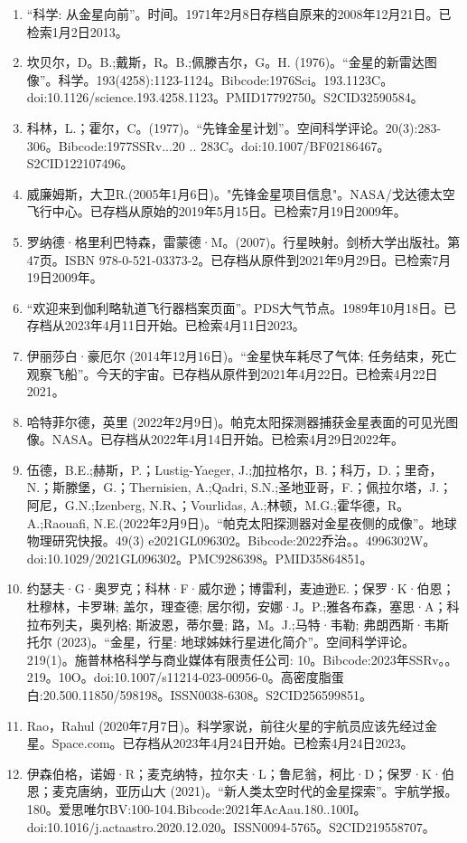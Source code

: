 \begin{enumerate}
\item “科学: 从金星向前”。时间。1971年2月8日存档自原来的2008年12月21日。已检索1月2日2013。
\item 坎贝尔，D。B.;戴斯，R。B.;佩滕吉尔，G。H. (1976)。“金星的新雷达图像”。科学。193(4258):1123-1124。Bibcode:1976Sci。193.1123C。doi:10.1126/science.193.4258.1123。PMID17792750。S2CID32590584。  
\item 科林，L.；霍尔，C。(1977)。“先锋金星计划”。空间科学评论。20(3):283-306。Bibcode:1977SSRv...20 .. 283C。doi:10.1007/BF02186467。S2CID122107496。 
\item 威廉姆斯，大卫R.(2005年1月6日)。"先锋金星项目信息"。NASA/戈达德太空飞行中心。已存档从原始的2019年5月15日。已检索7月19日2009年。
\item 罗纳德·格里利巴特森，雷蒙德·M。(2007)。行星映射。剑桥大学出版社。第47页。ISBN 978-0-521-03373-2。已存档从原件到2021年9月29日。已检索7月19日2009年。
\item “欢迎来到伽利略轨道飞行器档案页面”。PDS大气节点。1989年10月18日。已存档从2023年4月11日开始。已检索4月11日2023。
\item 伊丽莎白·豪厄尔 (2014年12月16日)。“金星快车耗尽了气体; 任务结束，死亡观察飞船”。今天的宇宙。已存档从原件到2021年4月22日。已检索4月22日2021。
\item 哈特菲尔德，英里 (2022年2月9日)。帕克太阳探测器捕获金星表面的可见光图像。NASA。已存档从2022年4月14日开始。已检索4月29日2022年。
\item 伍德，B.E.;赫斯，P.；Lustig-Yaeger, J.;加拉格尔，B.；科万，D.；里奇，N.；斯滕堡，G.；Thernisien, A.;Qadri, S.N.;圣地亚哥，F.；佩拉尔塔，J.；阿尼，G.N.;Izenberg, N.R、；Vourlidas, A.;林顿，M.G.;霍华德，R。A.;Raouafi, N.E.(2022年2月9日)。“帕克太阳探测器对金星夜侧的成像”。地球物理研究快报。49(3) e2021GL096302。Bibcode:2022乔治。。4996302W。doi:10.1029/2021GL096302。PMC9286398。PMID35864851。  
\item 约瑟夫·G·奥罗克；科林·F·威尔逊；博雷利，麦迪逊E.；保罗·K·伯恩；杜穆林，卡罗琳; 盖尔，理查德; 居尔彻，安娜·J。P.;雅各布森，塞思·A；科拉布列夫，奥列格; 斯波恩，蒂尔曼; 路，M。J.;马特·韦勒; 弗朗西斯·韦斯托尔 (2023)。“金星，行星: 地球姊妹行星进化简介”。空间科学评论。219(1)。施普林格科学与商业媒体有限责任公司: 10。Bibcode:2023年SSRv。。219。10O。doi:10.1007/s11214-023-00956-0。高密度脂蛋白:20.500.11850/598198。ISSN0038-6308。S2CID256599851。  
\item Rao，Rahul (2020年7月7日)。科学家说，前往火星的宇航员应该先经过金星。Space.com。已存档从2023年4月24日开始。已检索4月24日2023。
\item 伊森伯格，诺姆·R；麦克纳特，拉尔夫·L；鲁尼翁，柯比·D；保罗·K·伯恩；麦克唐纳，亚历山大 (2021)。“新人类太空时代的金星探索”。宇航学报。180。爱思唯尔BV:100-104.Bibcode:2021年AcAau.180..100I。doi:10.1016/j.actaastro.2020.12.020。ISSN0094-5765。S2CID219558707。  

\end{enumerate}
